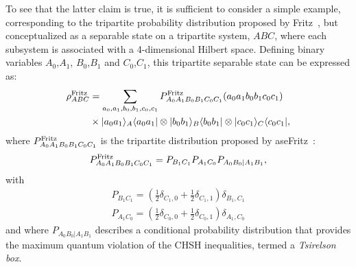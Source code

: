 \documentclass[12pt]{article}
\theoremstyle{plain}
\theoremstyle{definition}
\begin{document}
\begin{appendices}
To see that the latter claim is true,
 it is sufficient to consider a simple example, corresponding to the tripartite probability distribution proposed by Fritz~\cite{Fritz2012beyondBell}, but conceptualized as a separable state on a tripartite system, $ABC$, where each subsystem is associated with a 4-dimensional Hilbert space.
  Defining binary variables $A_0$,$A_1$, $B_0$,$B_1$ and $C_0$,$C_1$, this tripartite separable state
 can be expressed as:
\begin{align}\label{Fritzstate}
\rho^{\rm Fritz}_{ABC} &=\sum_{a_0,a_1,b_0,b_1,c_0,c_1} P^{\rm Fritz}_{A_0 A_1 B_0 B_1 C_0 C_1}(a_0 a_1 b_0 b_1 c_0 c_1)\nonumber\\
&\times  | a_0 a_1 \rangle_A \langle a_0 a_1 | \otimes  | b_0 b_1 \rangle_B \langle b_0 b_1 |\otimes | c_0 c_1 \rangle_C \langle c_0 c_1 |,
\end{align}
where $P^{\rm Fritz}_{A_0 A_1 B_0 B_1 C_0 C_1}$ is the tripartite distribution proposed by aseFritz~\cite{Fritz2012beyondBell}:
\begin{align}\label{Fritzdistn}
P^{\rm Fritz}_{A_0 A_1 B_0 B_1 C_0 C_1} = P_{B_1 C_1} P_{A_1 C_0} P_{A_0 B_0 |A_1 B_1},
\end{align}
with
\begin{align}
P_{B_1 C_1} =  (\tfrac{1}{2} \delta_{C_1,0} +\tfrac{1}{2} \delta_{C_1,1}) \delta_{B_1, C_1}\nonumber\\
P_{A_1 C_0} =  (\tfrac{1}{2} \delta_{C_0,0} +\tfrac{1}{2} \delta_{C_0,1}) \delta_{A_1, C_0}\nonumber
\end{align}
and where $P_{A_0 B_0 |A_1 B_1}$ describes a conditional probability distribution that provides the maximum quantum violation of the CHSH inequalities, termed a {\em Tsirelson box}.


\end{appendices}
\end{document}
